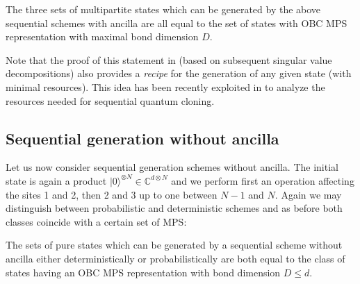 \documentclass[aps,prl,epsfig,graphics,floatfix,mathbbm,a4paper]{article}
\newcommand{\1}{\mathbbm{1}}
\renewcommand{\>}{\rangle}
\newcommand{\<}{\langle}
\begin{document}
\begin{theorem}\label{Thm:seqwith} The three sets of
    multipartite states which can be generated by the above sequential
    schemes with ancilla are all equal to the set of states with OBC
    MPS representation with maximal bond dimension $D$.
\end{theorem}
Note that the proof of this statement in \cite{SSVCW} (based on
subsequent singular value decompositions) also provides a
\emph{recipe} for the generation of any given state (with minimal
resources). This idea has been recently exploited in \cite{Kike}
to analyze the resources needed for sequential quantum cloning.

\subsection{Sequential generation without ancilla}\label{Sec:gen2}

Let us now consider sequential generation schemes without ancilla.
The initial state is again a product $|0\rangle^{\otimes N} \in
    \mathbb{C}^{d\otimes N}$ and we perform first an operation
affecting the sites 1 and 2, then 2 and 3  up to one between $N-1$
and $N$. Again we may distinguish between probabilistic and
deterministic schemes and as before both classes coincide with a
certain set of MPS:
\begin{theorem}
     The sets of pure states
    which can be generated by a sequential scheme without ancilla
    either deterministically or probabilistically  are both equal to
    the class of states having an OBC MPS representation with bond
    dimension $D\leq d$.
\end{theorem}

\end{document}
